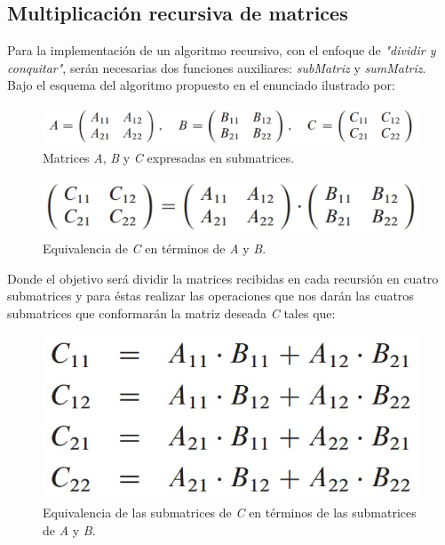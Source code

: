 \documentclass{article}
\begin{document}
\subsection{Multiplicación recursiva de matrices}

Para la implementación de un algoritmo recursivo, con el enfoque de \textit{"dividir y conquitar"}, serán necesarias dos funciones auxiliares: \textit{subMatriz} y \textit{sumMatriz}. Bajo el esquema del algoritmo propuesto en el enunciado ilustrado por:

\begin{figure}[h]
    \begin{minipage}{1\textwidth}
        \centering
        \includegraphics[scale=0.3]{Imagen1.png}
        \caption{Matrices \textit{A}, \textit{B} y \textit{C} expresadas en submatrices.}
        \label{1}
    \end{minipage}
\end{figure}

\begin{figure}[h]
    \begin{minipage}{1\textwidth}
        \centering
        \includegraphics[scale=0.25]{Imagen2.png}
        \caption{Equivalencia de \textit{C} en términos de \textit{A} y \textit{B}.}
        \label{1}
    \end{minipage}
\end{figure}


Donde el objetivo será dividir la matrices recibidas en cada recursión en cuatro submatrices y para éstas realizar las operaciones que nos darán las cuatros submatrices que conformarán la matriz deseada \textit{C} tales que:

\begin{figure}[h]
    \begin{minipage}{1\textwidth}
        \centering
        \includegraphics[scale=0.25]{Imagen3.png}
        \caption{Equivalencia de las submatrices de \textit{C} en términos de las submatrices de \textit{A} y \textit{B}.}
        \label{1}
    \end{minipage}
\end{figure}
\end{document}
